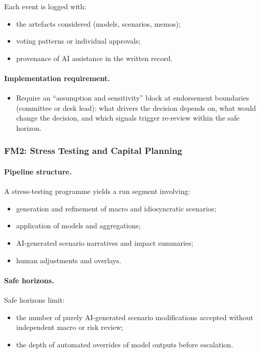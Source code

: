 Each event is logged with:

\begin{itemize}
  \item the artefacts considered (models, scenarios, memos);
  \item voting patterns or individual approvals;
  \item provenance of AI assistance in the written record.
\end{itemize}

\paragraph{Implementation requirement.}
\begin{itemize}
  \item Require an “assumption and sensitivity” block at endorsement boundaries (committee or desk lead):
        what drivers the decision depends on, what would change the decision, and which signals trigger
        re-review within the safe horizon.
\end{itemize}
\subsubsection*{FM2: Stress Testing and Capital Planning}

\paragraph{Pipeline structure.}
A stress-testing programme yields a run segment involving:

\begin{itemize}
  \item generation and refinement of macro and idiosyncratic scenarios;
  \item application of models and aggregations;
  \item AI-generated scenario narratives and impact summaries;
  \item human adjustments and overlays.
\end{itemize}

\paragraph{Safe horizons.}
Safe horizons limit:

\begin{itemize}
  \item the number of purely AI-generated scenario modifications accepted
        without independent macro or risk review;
  \item the depth of automated overrides of model outputs before escalation.
\end{itemize}

